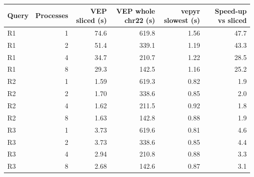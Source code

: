 \begin{tabular}{lrrrrr}
\toprule
Query & Processes & VEP sliced (s) & VEP whole chr22 (s) & vepyr slowest (s) & Speed-up vs sliced \\
\midrule
R1 & 1 & 74.6 & 619.8 & 1.56 & 47.7 \\
R1 & 2 & 51.4 & 339.1 & 1.19 & 43.3 \\
R1 & 4 & 34.7 & 210.7 & 1.22 & 28.5 \\
R1 & 8 & 29.3 & 142.5 & 1.16 & 25.2 \\
R2 & 1 & 1.59 & 619.3 & 0.82 & 1.9 \\
R2 & 2 & 1.70 & 338.6 & 0.85 & 2.0 \\
R2 & 4 & 1.62 & 211.5 & 0.92 & 1.8 \\
R2 & 8 & 1.63 & 142.8 & 0.88 & 1.9 \\
R3 & 1 & 3.73 & 619.6 & 0.81 & 4.6 \\
R3 & 2 & 3.73 & 338.6 & 0.85 & 4.4 \\
R3 & 4 & 2.94 & 210.8 & 0.88 & 3.3 \\
R3 & 8 & 2.68 & 142.6 & 0.87 & 3.1 \\
\bottomrule
\end{tabular}
